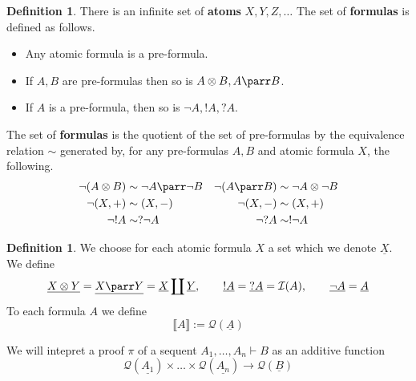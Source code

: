 \documentclass[12pt]{article}
\theoremstyle{plain}
\theoremstyle{definition}
\newtheorem{defn}[thm]{Definition} %
\newcommand{\call}[1]{\mathcal{#1}}
\newcommand{\Ical}{\call{I}}
\newcommand{\Qcal}{\call{Q}}
\newcommand{\lto}{\longrightarrow}
\begin{document}
	\begin{defn}
		There is an infinite set of \textbf{atoms} $X, Y, Z, \ldots$ The set of \textbf{formulas} is defined as follows.
		\begin{itemize}
			\item Any atomic formula is a pre-formula.
			\item If $A,B$ are pre-formulas then so is $A \otimes B, A \parr B$.
			\item If $A$ is a pre-formula, then so is $\neg A, ! A, ?A$.
			\end{itemize}
		The set of \textbf{formulas} is the quotient of the set of pre-formulas by the equivalence relation $\sim$ generated by, for any pre-formulas $A,B$ and atomic formula $X$, the following.
		\begin{align*}
			\neg(A \otimes B) &\sim \neg A \parr \neg B & \neg(A \parr B) &\sim \neg A \otimes \neg B\\
			\neg (X,+) &\sim (X,-) & \neg (X,-) &\sim (X,+)\\
			\neg !A &\sim ? \neg A & \neg ? A &\sim ! \neg A
			\end{align*}
		\end{defn}
	
	\begin{defn}
		We choose for each atomic formula $X$ a set which we denote $\underline{X}$. We define
		\begin{equation}
			\underline{X \otimes Y} = \underline{X \parr Y} = \underline{X} \coprod \underline{Y},\qquad \underline{! A} = \underline{? A} = \Ical(A),\qquad \underline{\neg A} = \underline{A}
			\end{equation}
		To each formula $A$ we define
		\begin{equation}
			\llbracket A \rrbracket := \Qcal(\underline{A})
			\end{equation}
		\end{defn}
	
	We will intepret a proof $\pi$ of a sequent $A_1, \ldots, A_n \vdash B$ as an additive function
	\begin{equation}
		\Qcal(\underline{A_1}) \times \ldots \times \Qcal(\underline{A_n}) \lto \Qcal(\underline{B})
		\end{equation}
	
\end{document}
